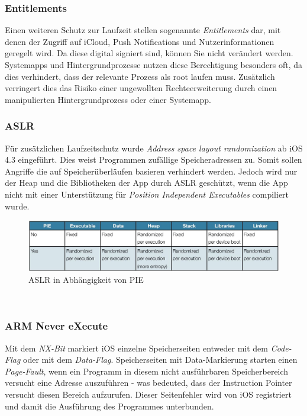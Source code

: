 		\subsubsection{Entitlements}
			Einen weiteren Schutz zur Laufzeit stellen sogenannte \textsl{Entitlements}
			dar, mit denen der Zugriff auf iCloud, Push	Notifications und
			Nutzerinformationen geregelt wird. Da diese digital signiert sind, können Sie
			nicht verändert werden. Systemapps und Hintergrundprozesse nutzen diese
			Berechtigung besonders oft, da dies verhindert, dass der relevante Prozess als
			root laufen muss. Zusätzlich verringert dies das Risiko einer ungewollten
			Rechteerweiterung durch einen manipulierten Hintergrundprozess oder einer
			Systemapp.\\
		
		\subsubsection{ASLR}
			Für zusätzlichen Laufzeitschutz wurde \textsl{Address space layout
			randomization}\cite[S.1]{iOS4SecurityEvalutaion} ab iOS 4.3 eingeführt. Dies
			weist Programmen zufällige Speicheradressen zu. Somit sollen Angriffe die auf
			Speicherüberläufen basieren verhindert werden\cite[S.131]{Levin2012}. Jedoch
			wird nur der Heap und die Bibliotheken der App durch ASLR geschützt, wenn
			die App nicht mit einer Unterstützung für \textsl{Position Independent
			Executables} compiliert wurde.
			\begin{figure}[h]
				\centering
				\includegraphics[width=0.9\linewidth]{ios/media/aslr-pie.jpg}
				\caption{ASLR in Abhängigkeit von PIE
				\cite[S.1]{iOS4SecurityEvalutaion}}
				\label{fig:aslr}
			\end{figure}\\
		
		\subsubsection{ARM Never eXecute}
			Mit dem \textsl{NX-Bit} markiert iOS einzelne Speicherseiten entweder mit dem
			\textsl{Code-Flag} oder mit dem \textsl{Data-Flag}. Speicherseiten mit
			Data-Markierung starten einen \textsl{Page-Fault}, wenn ein Programm in
			diesem nicht ausführbaren Speicherbereich versucht eine Adresse auszuführen
			- was bedeuted, dass der Instruction Pointer versucht diesen Bereich
			aufzurufen. Dieser Seitenfehler wird von iOS registriert und damit die
			Ausführung des Programmes unterbunden\cite[S.310]{Levin2012}.
			
